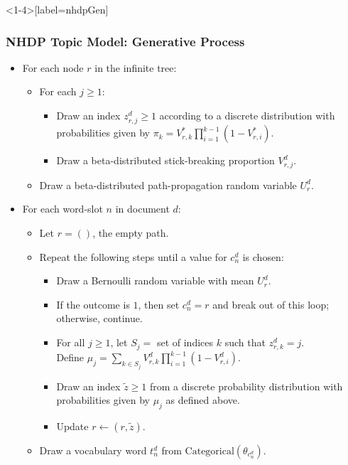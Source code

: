 \begin{frame}<1-4>[label=nhdpGen]
\frametitle{NHDP Topic Model: Generative Process}
  \begin{itemize}[<+->]
  \item For each node $r$ in the infinite tree:
    \begin{itemize}
    \item For each $j \geq 1$:
      \begin{itemize}
      \item Draw an index $z^d_{r,j} \geq 1$ according to a discrete distribution with probabilities given by $\pi_k = V^*_{r,k} \prod_{i=1}^{k-1} (1-V^*_{r,i})$.
      \item Draw a beta-distributed stick-breaking proportion $V^d_{r,j}$.
      \end{itemize}
    \item Draw a beta-distributed path-propagation random variable $U^d_r$.
    \end{itemize}
  \item For each word-slot $n$ in document $d$:
    \begin{itemize}
    \item Let $r = ()$, the empty path.
    \item Repeat the following steps until a value for $c^d_n$ is chosen:
      \begin{itemize}
      \item Draw a Bernoulli random variable with mean $U^d_r$.
      \item If the outcome is $1$, then set $c^d_n = r$ and break out of this loop; otherwise, continue.
      \item For all $j \geq 1$, let $S_j =$ set of indices $k$ such that $z^d_{r,k} = j$. \\
      Define $\mu_j = \sum_{k \in S_j} V^d_{r,k} \prod_{i=1}^{k-1} (1-V^d_{r,i})$.
      \item Draw an index $\tilde z \geq 1$ from a discrete probability distribution with probabilities given by $\mu_j$ as defined above.
      \item Update $r \gets (r, \tilde z)$.
      \end{itemize}
    \item Draw a vocabulary word $t^d_n$ from $\text{Categorical}(\theta_{c^d_n})$.
    \end{itemize}
  \end{itemize}
\end{frame}

